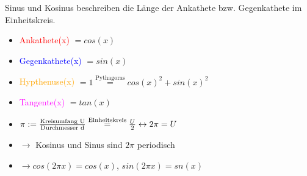 \documentclass[]{article}
\begin{document}
\begin{definition}[Einheitskreis]
Sinus und Kosinus beschreiben die Länge der Ankathete bzw. Gegenkathete im Einheitskreis.

\begin{multicols}{2}
	\begin{itemize}[label={}, noitemsep]
		\item \textcolor{red}{Ankathete(x)} $= cos(x)$
		\item \textcolor{blue}{Gegenkathete(x)} $= sin(x)$
		\item \textcolor{orange}{Hypthenuse(x)} $= 1 \overset{\text{Pythagoras}}{=} cos(x)^2 + sin(x)^2$	
		\item \textcolor{magenta}{Tangente(x)} $= tan(x)$			
		\item $\pi := \frac{\textnormal{Kreisumfang U}}{\textnormal{Durchmesser d}} \overset{\text{Einheitskreis}}{=} \frac{U}{2} \leftrightarrow 2 \pi = U $
		\item $\rightarrow$ Kosinus und Sinus sind $2 \pi$ periodisch
		\item $\rightarrow cos(2 \pi x) = cos(x)$, $sin(2 \pi x) = sn(x)$
	\end{itemize}
\end{multicols}



\end{definition}
\end{document}
